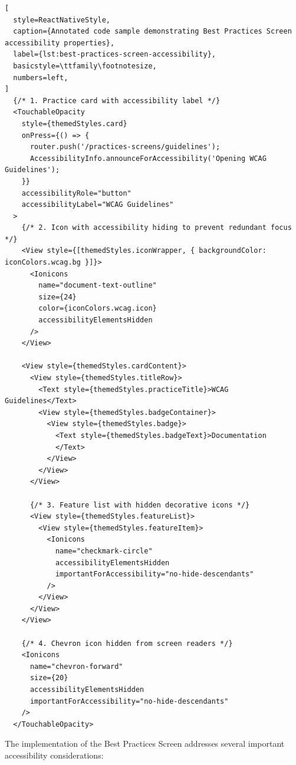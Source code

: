 \begin{lstlisting}[
  style=ReactNativeStyle,
  caption={Annotated code sample demonstrating Best Practices Screen accessibility properties},
  label={lst:best-practices-screen-accessibility},
  basicstyle=\ttfamily\footnotesize,
  numbers=left,
]
  {/* 1. Practice card with accessibility label */}
  <TouchableOpacity
    style={themedStyles.card}
    onPress={() => {
      router.push('/practices-screens/guidelines');
      AccessibilityInfo.announceForAccessibility('Opening WCAG Guidelines');
    }}
    accessibilityRole="button"
    accessibilityLabel="WCAG Guidelines"
  >
    {/* 2. Icon with accessibility hiding to prevent redundant focus */}
    <View style={[themedStyles.iconWrapper, { backgroundColor: iconColors.wcag.bg }]}>
      <Ionicons
        name="document-text-outline"
        size={24}
        color={iconColors.wcag.icon}
        accessibilityElementsHidden
      />
    </View>

    <View style={themedStyles.cardContent}>
      <View style={themedStyles.titleRow}>
        <Text style={themedStyles.practiceTitle}>WCAG Guidelines</Text>
        <View style={themedStyles.badgeContainer}>
          <View style={themedStyles.badge}>
            <Text style={themedStyles.badgeText}>Documentation
            </Text>
          </View>
        </View>
      </View>

      {/* 3. Feature list with hidden decorative icons */}
      <View style={themedStyles.featureList}>
        <View style={themedStyles.featureItem}>
          <Ionicons
            name="checkmark-circle"
            accessibilityElementsHidden
            importantForAccessibility="no-hide-descendants"
          />
        </View>
      </View>
    </View>

    {/* 4. Chevron icon hidden from screen readers */}
    <Ionicons
      name="chevron-forward"
      size={20}
      accessibilityElementsHidden
      importantForAccessibility="no-hide-descendants"
    />
  </TouchableOpacity>
\end{lstlisting}

The implementation of the Best Practices Screen addresses several important accessibility considerations:

